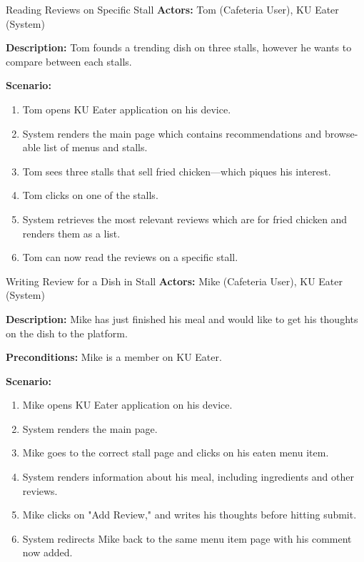 \begin{usecase}{Reading Reviews on Specific Stall}
    \textbf{Actors:} Tom (Cafeteria User), KU Eater (System)

    \textbf{Description:} Tom founds a trending dish on three stalls, however he wants to compare between each stalls.

    \textbf{Scenario:}

    \begin{enumerate}[leftmargin=80pt]
        \item Tom opens KU Eater application on his device.
        \item System renders the main page which contains recommendations and browse-able list of menus and stalls.
        \item Tom sees three stalls that sell fried chicken---which piques his interest.
        \item Tom clicks on one of the stalls.
        \item System retrieves the most relevant reviews which are for fried chicken and renders them as a list.
        \item Tom can now read the reviews on a specific stall.
    \end{enumerate}
\end{usecase}

\begin{usecase}{Writing Review for a Dish in Stall}
    \textbf{Actors:} Mike (Cafeteria User), KU Eater (System)

    \textbf{Description:} Mike has just finished his meal and would like to get his thoughts on the dish to the platform.

    \textbf{Preconditions:} Mike is a member on KU Eater.

    \textbf{Scenario:}

    \begin{enumerate}[leftmargin=80pt]
        \item Mike opens KU Eater application on his device.
        \item System renders the main page.
        \item Mike goes to the correct stall page and clicks on his eaten menu item.
        \item System renders information about his meal, including ingredients and other reviews.
        \item Mike clicks on "Add Review," and writes his thoughts before hitting submit.
        \item System redirects Mike back to the same menu item page with his comment now added.
    \end{enumerate}
\end{usecase}

